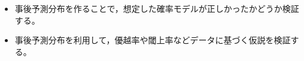 \begin{itemize}
	\item 事後予測分布を作ることで，想定した確率モデルが正しかったかどうか検証する。
	\item 事後予測分布を利用して，優越率や閾上率などデータに基づく仮説を検証する。
\end{itemize}
